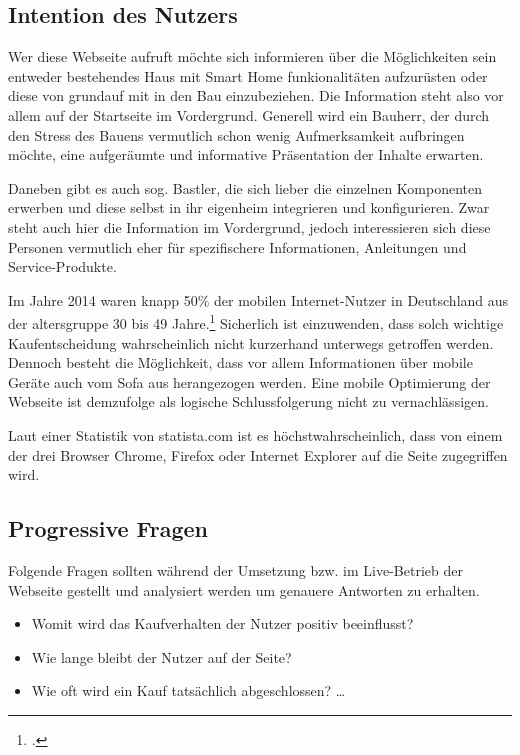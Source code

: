 \subsection{Intention des Nutzers}
Wer diese Webseite aufruft möchte sich informieren über die Möglichkeiten sein entweder bestehendes Haus mit Smart Home funkionalitäten aufzurüsten oder diese von grundauf mit in den Bau einzubeziehen. Die Information steht also vor allem auf der Startseite im Vordergrund. Generell wird ein Bauherr, der durch den Stress des Bauens vermutlich schon wenig Aufmerksamkeit aufbringen möchte, eine aufgeräumte und informative Präsentation der Inhalte erwarten.

Daneben gibt es auch sog. Bastler, die sich lieber die einzelnen Komponenten erwerben und diese selbst in ihr eigenheim integrieren und konfigurieren. Zwar steht auch hier die Information im Vordergrund, jedoch interessieren sich diese Personen vermutlich eher für spezifischere Informationen, Anleitungen und Service-Produkte.

Im Jahre 2014 waren knapp 50\% der mobilen Internet-Nutzer in Deutschland aus der altersgruppe 30 bis 49 Jahre.\footcite[vgl.][]{statista:alter} Sicherlich ist einzuwenden, dass solch wichtige Kaufentscheidung wahrscheinlich nicht kurzerhand unterwegs getroffen werden. Dennoch besteht die Möglichkeit, dass vor allem Informationen über mobile Geräte auch vom Sofa aus herangezogen werden. Eine mobile Optimierung der Webseite ist demzufolge als logische Schlussfolgerung nicht zu vernachlässigen. 

Laut einer Statistik von statista.com ist es höchstwahrscheinlich, dass von einem der drei Browser Chrome, Firefox oder Internet Explorer auf die Seite zugegriffen wird. 

\subsection{Progressive Fragen}
Folgende Fragen sollten während der Umsetzung bzw. im Live-Betrieb der Webseite gestellt und analysiert werden um genauere Antworten zu erhalten.
\begin{itemize}
	\item Womit wird das Kaufverhalten der Nutzer positiv beeinflusst? 
	\item Wie lange bleibt der Nutzer auf der Seite? 
	\item Wie oft wird ein Kauf tatsächlich abgeschlossen? \ldots
\end{itemize}
